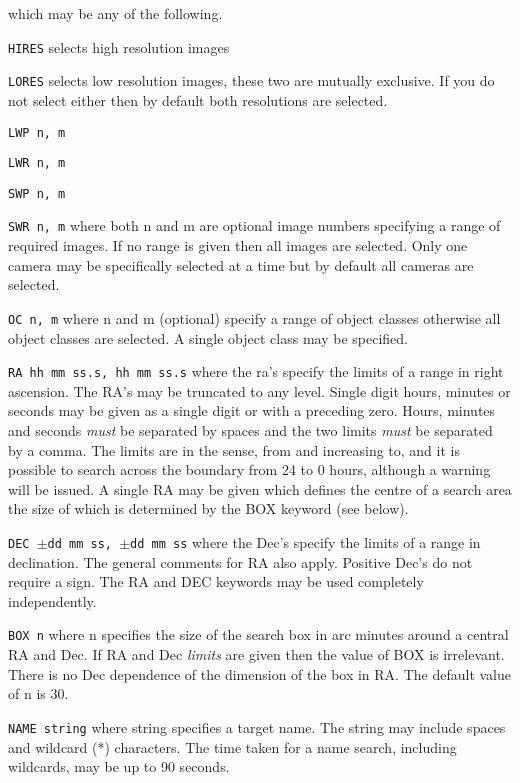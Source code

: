 \documentclass[11pt,twoside,nolof,noabs]{starlink}
\begin{document}
\begin{terminalv}
Enter search key}
\end{terminalv}
which may be any of the following.

\texttt{HIRES} selects high resolution images

\texttt{LORES} selects low resolution images, these two are mutually exclusive.
If you do not select either then by default both resolutions are selected.

\smallskip
\texttt{LWP n, m}

\texttt{LWR n, m}

\texttt{SWP n, m}

\texttt{SWR n, m} where both n and m are optional image numbers specifying a range
of required images. If no range is given then all images are selected.
Only one camera may be specifically selected at a time but by default all
cameras are selected.

\smallskip
\texttt{OC n, m} where n and m (optional) specify a range of object classes
otherwise
all object classes are selected. A single object class may be specified.

\smallskip
\texttt{RA hh mm ss.s, hh mm ss.s} where the ra's specify the limits of a range in
right ascension.
The RA's may be truncated to any level. Single digit hours, minutes or seconds
may be given as a single digit or with a preceding zero. Hours, minutes and
seconds \textit{must} be separated by spaces and the two limits \textit{must} be
separated by a comma. The limits are in the sense, from and increasing to,
and it is possible to search across the boundary from 24 to 0 hours, although
a warning will be issued.
A single RA may be given which defines the centre of
a search area the size of which is determined by the BOX keyword (see below).

\smallskip
\texttt{DEC $\pm$dd mm ss, $\pm$dd mm ss} where the Dec's specify the limits of
a range in
declination. The general comments for RA also apply. Positive Dec's do not
require a sign.
The RA and DEC keywords may be used completely independently.

\smallskip
\texttt{BOX n} where n
specifies the size of the search box in arc minutes around a central
RA and Dec. If RA and Dec \textit{limits} are given then the value of BOX is
irrelevant. There is no Dec dependence of the dimension of the box in RA.
The default value of n is 30.

\smallskip
\texttt{NAME string} where string specifies a target name. The string may include
spaces and wildcard (*) characters. The time taken for a name search, including
wildcards, may be up to 90 seconds.
\end{document}
